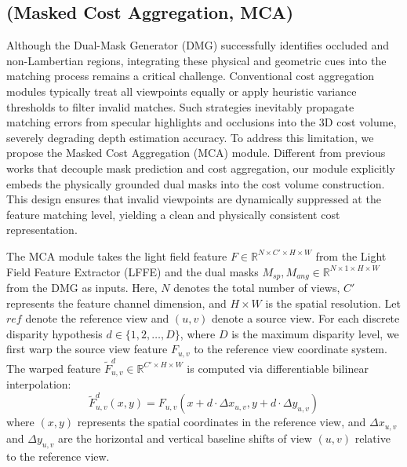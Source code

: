 \documentclass[lettersize,journal]{IEEEtran}
\begin{document}
\subsection{(Masked Cost Aggregation, MCA)}

Although the Dual-Mask Generator (DMG) successfully identifies occluded and non-Lambertian regions, integrating these physical and geometric cues into the matching process remains a critical challenge. Conventional cost aggregation modules typically treat all viewpoints equally or apply heuristic variance thresholds to filter invalid matches. Such strategies inevitably propagate matching errors from specular highlights and occlusions into the 3D cost volume, severely degrading depth estimation accuracy. To address this limitation, we propose the Masked Cost Aggregation (MCA) module. Different from previous works that decouple mask prediction and cost aggregation, our module explicitly embeds the physically grounded dual masks into the cost volume construction. This design ensures that invalid viewpoints are dynamically suppressed at the feature matching level, yielding a clean and physically consistent cost representation.

The MCA module takes the light field feature $F \in \mathbb{R}^{N \times C' \times H \times W}$ from the Light Field Feature Extractor (LFFE) and the dual masks $M_{sp}, M_{ang} \in \mathbb{R}^{N \times 1 \times H \times W}$ from the DMG as inputs. Here, $N$ denotes the total number of views, $C'$ represents the feature channel dimension, and $H \times W$ is the spatial resolution. Let $ref$ denote the reference view and $(u,v)$ denote a source view. For each discrete disparity hypothesis $d \in \{1, 2, \dots, D\}$, where $D$ is the maximum disparity level, we first warp the source view feature $F_{u,v}$ to the reference view coordinate system. The warped feature $\tilde{F}_{u,v}^d \in \mathbb{R}^{C' \times H \times W}$ is computed via differentiable bilinear interpolation:
\begin{equation}
\label{eq:eq9}
\tilde{F}_{u,v}^d(x,y) = F_{u,v}(x + d \cdot \Delta x_{u,v}, y + d \cdot \Delta y_{u,v})
\end{equation}
where $(x,y)$ represents the spatial coordinates in the reference view, and $\Delta x_{u,v}$ and $\Delta y_{u,v}$ are the horizontal and vertical baseline shifts of view $(u,v)$ relative to the reference view.
\end{document}
